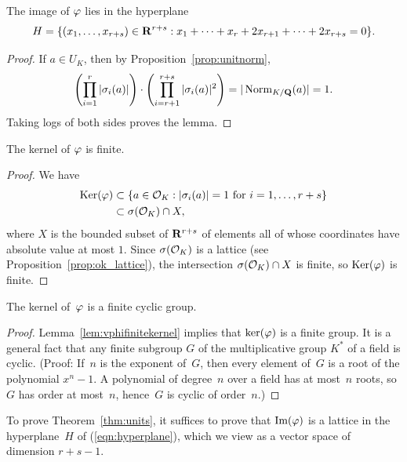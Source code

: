 \begin{lemma}\label{lem:inh}
The image of $\varphi$ lies in the hyperplane 
\begin{equation}\label{eqn:hyperplane}
H = \{(x_1,\ldots, x_{r+s})\in\mathbf{R}^{r+s} : 
  x_1+ \cdots + x_r + 2x_{r+1} + \cdots + 2x_{r+s} = 0\}.
\end{equation}
\end{lemma}
\begin{proof}
If $a\in U_K$, then 
by Proposition~\ref{prop:unitnorm}, 
$$\left(\prod_{i=1}^{r} |\sigma_i(a)|\right) 
  \cdot \left( \prod_{i=r+1}^{r+s} |\sigma_i(a)|^2 \right) = 
|\operatorname{Norm}_{K/\mathbf{Q}}(a)| = 1.$$
Taking logs of both sides proves the lemma.
\end{proof}

\begin{lemma}\label{lem:vphifinitekernel}
The kernel of $\varphi$ is finite.
\end{lemma}
\begin{proof}
We have
\begin{align*}
  \operatorname{Ker}(\varphi) &\subset \{a\in\mathcal{O}_K : |\sigma_i(a)| = 1 \text{ for }i=1,\ldots,r+s\}\\
              &\subset \sigma(\mathcal{O}_K) \cap X,
\end{align*}
where $X$ is the bounded subset of $\mathbf{R}^{r+s}$ of elements all of whose coordinates
have absolute value at most $1$.  Since $\sigma(\mathcal{O}_K)$ is a lattice 
(see Proposition~\ref{prop:ok_lattice}), 
the intersection $\sigma(\mathcal{O}_K)\cap X$ is finite, so $\operatorname{Ker}(\varphi)$ is finite.
\end{proof}

\begin{lemma}\label{lem:kerfcg}
The kernel of~$\varphi$ is a finite cyclic group.
\end{lemma}
\begin{proof}
  Lemma~\ref{lem:vphifinitekernel} implies that $\ker(\varphi)$ is a
  finite group.  It is a general fact that any finite subgroup $G$ of
  the multiplicative group $K^*$ of a field is cyclic.  (Proof: If~$n$
  is the exponent of~$G$, then every element of~$G$ is a root of the
  polynomial $x^n-1$.  A polynomial of degree~$n$ over a field has at
  most~$n$ roots, so $G$ has order at most~$n$, hence~$G$ is cyclic of
  order~$n$.)
\end{proof}

To prove Theorem~\ref{thm:units}, it suffices to prove that
$\text{Im}(\varphi)$ is a lattice in the hyperplane~$H$ of
(\ref{eqn:hyperplane}), which we view as a vector space of dimension
$r+s-1$.

